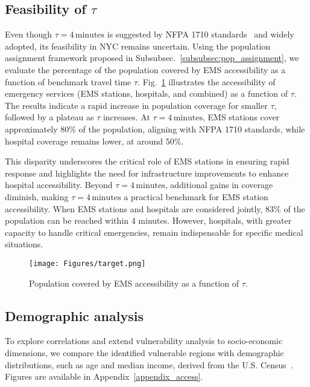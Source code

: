 \subsection{Feasibility of \texorpdfstring{$\tau$}{tau}}\label{subsec:tau}
Even though $\tau = 4 \, \text{minutes}$ is suggested by NFPA 1710 standards~\cite{NFPA1710} and widely adopted, its feasibility in NYC remains uncertain. Using the population assignment framework proposed in Subsubsec.~\ref{subsubsec:pop_assignment}, we evaluate the percentage of the population covered by EMS accessibility as a function of benchmark travel time $\tau$. Fig.~\ref{fig:covered_func} illustrates the accessibility of emergency services (EMS stations, hospitals, and combined) as a function of $\tau$. The results indicate a rapid increase in population coverage for smaller $\tau$, followed by a plateau as $\tau$ increases. At $\tau = 4 \, \text{minutes}$, EMS stations cover approximately 80\% of the population, aligning with NFPA 1710 standards, while hospital coverage remains lower, at around 50\%.

This disparity underscores the critical role of EMS stations in ensuring rapid response and highlights the need for infrastructure improvements to enhance hospital accessibility. Beyond $\tau = 4 \, \text{minutes}$, additional gains in coverage diminish, making $\tau = 4 \, \text{minutes}$ a practical benchmark for EMS station accessibility. When EMS stations and hospitals are considered jointly, 83\% of the population can be reached within 4 minutes. However, hospitals, with greater capacity to handle critical emergencies, remain indispensable for specific medical situations. 

\begin{figure}[ht]
    \centering
    \texttt{[image: Figures/target.png]} 
    \caption{Population covered by EMS accessibility as a function of $\tau$.}
    \label{fig:covered_func}
\end{figure}
\subsection{Demographic analysis}\label{subsec:demographic_analysis}
To explore correlations and extend vulnerability analysis to socio-economic dimensions, we compare the identified vulnerable regions with demographic distributions, such as age and median income, derived from the U.S. Census~\cite{bureau2023census}. Figures are available in Appendix~\ref{appendix_access}.

